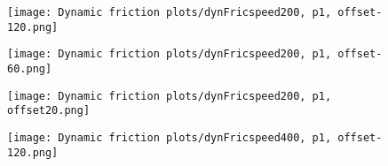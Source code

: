 \documentclass[12pt]{article}
\begin{document}
\begin{figure}[!h]
    \centering
    \begin{minipage}{0.49\textwidth}       
         \texttt{[image: Dynamic friction plots/dynFricspeed200, p1, offset-120.png]}
    \end{minipage}
    \begin{minipage}{0.49\textwidth}       
         \texttt{[image: Dynamic friction plots/dynFricspeed200, p1, offset-60.png]}
    \end{minipage}

\end{figure}

\begin{figure}[!h]
    \centering
    \begin{minipage}{0.49\textwidth}       
         \texttt{[image: Dynamic friction plots/dynFricspeed200, p1, offset20.png]}
    \end{minipage}
    \begin{minipage}{0.49\textwidth}       
         \texttt{[image: Dynamic friction plots/dynFricspeed400, p1, offset-120.png]}
    \end{minipage}

\end{figure}
\end{document}
